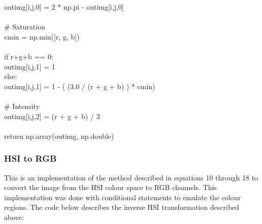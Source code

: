\documentclass{article}
\begin{document}
	\indent \indent \indent \indent out\textunderscore img[i,j,0] = 2 * np.pi - out\textunderscore img[i,j,0]\\
	\\
	\indent \indent \indent \# Saturation\\
	\indent \indent \indent	c\textunderscore min = np.min([r, g, b])\\
	\\
	\indent \indent \indent if r+g+b == 0:\\
	\indent \indent \indent \indent out\textunderscore img[i,j,1] = 1\\
	\indent \indent \indent else:\\
	\indent \indent \indent \indent out\textunderscore img[i,j,1] = 1 - ( (3.0 / (r + g + b) ) * c\textunderscore min)\\
	\\
	\indent \indent \indent \# Intensity\\
	\indent \indent \indent out\textunderscore img[i,j,2] = (r + g + b) / 3\\
	\\
	\indent return np.array(out\textunderscore img, np.double)

	\subsubsection{HSI to RGB}
		
	This is an implementation of the method described in equations 10 through 18 to convert the image from the HSI colour space to RGB channels. This implementation was done with conditional statements to emulate the colour regions. The code below describes the inverse HSI transformation described above:\\
	
\end{document}
